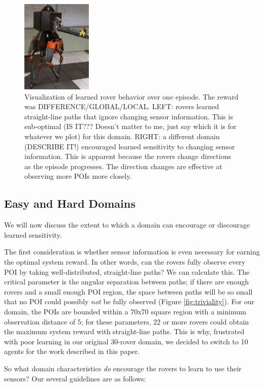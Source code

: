 \documentclass[letterpaper, 10 pt, conference]{ieeeconf}  %
\begin{document}
\begin{figure}[h!]
    \centering
    \includegraphics[width=0.3\textwidth]{ATRIAS.jpg}
    \caption{Visualization of learned rover behavior over one episode. The reward was DIFFERENCE/GLOBAL/LOCAL. LEFT: rovers learned straight-line paths that ignore changing sensor information. This is sub-optimal (IS IT??? Doesn't matter to me, just say which it is for whatever we plot) for this domain. RIGHT: a different domain (DESCRIBE IT!) encouraged learned sensitivity to changing sensor information. This is apparent because the rovers change directions as the episode progresses. The direction changes are effective at observing more POIs more closely. }
    \label{fig:sensitivity}
\end{figure}


\subsection{Easy and Hard Domains}
We will now discuss the extent to which a domain can encourage or discourage learned sensitivity. 

The first consideration is whether sensor information is even necessary for earning the optimal system reward. In other words, can the rovers fully observe every POI by taking well-distributed, straight-line paths? We can calculate this. The critical parameter is the angular separation between paths; if there are enough rovers and a small enough POI region, the space between paths will be so small that no POI could possibly \emph{not} be fully observed (Figure \ref{fig:triviality}). For our domain, the POIs are bounded within a 70x70 square region with a minimum observation distance of 5; for these parameters, 22 or more rovers could obtain the maximum system reward with straight-line paths. This is why, frustrated with poor learning in our original 30-rover domain, we decided to switch to 10 agents for the work described in this paper.

So what domain characteristics \emph{do} encourage the rovers to learn to use their sensors? Our several guidelines are as follows:
\end{document}
